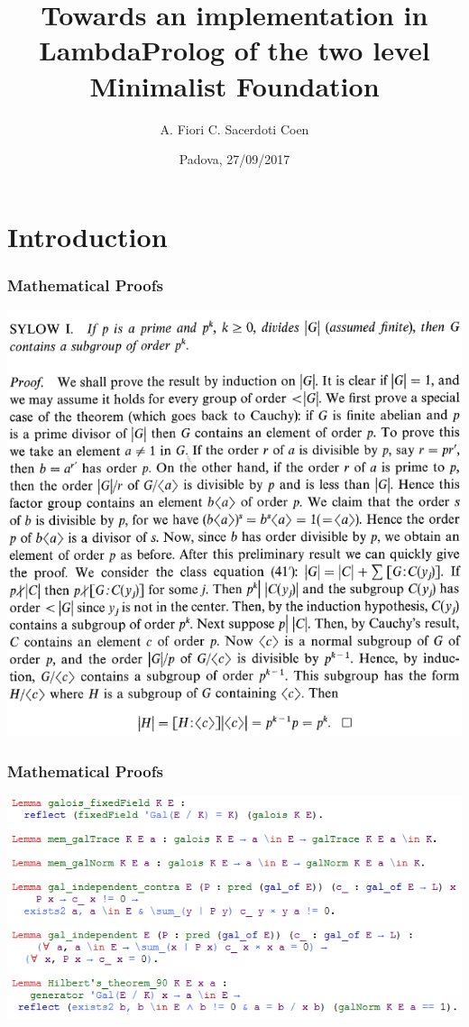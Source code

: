 \documentclass{beamer}
\title{Towards an implementation in LambdaProlog of the two level Minimalist Foundation}
\author{\hspace{1.7cm} A. Fiori \quad \quad C. Sacerdoti Coen}
\institute[University of Bologna]
{
  University of Padova \quad \quad
  University of Bologna
}
\date {Padova, 27/09/2017}
\begin{document}
\begin{frame}
  \titlepage
\end{frame}

\begin{frame}[fragile]
 \tableofcontents
\end{frame}


\section{Introduction}

\begin{frame}
\frametitle{Mathematical Proofs}
\begin{center}
{\includegraphics[width=\textwidth,height=0.8\textheight,keepaspectratio]{proof.png}}
\end{center}
\end{frame}

\begin{frame}
\frametitle{Mathematical Proofs}
\begin{center}
	{\includegraphics[width=\textwidth,height=0.8\textheight,keepaspectratio]{coq2.png}}
\end{center}
\end{frame}
\end{document}
